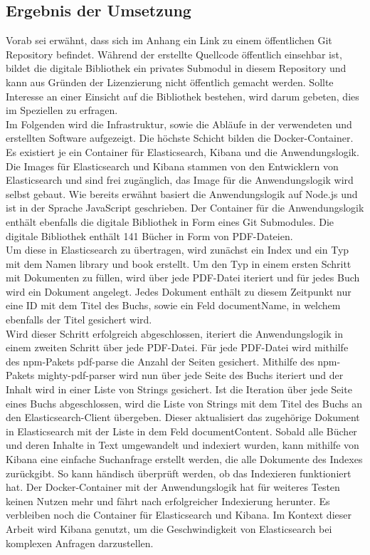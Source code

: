 \documentclass[a4paper]{scrartcl}
\begin{document}
\subsection{Ergebnis der Umsetzung}
Vorab sei erwähnt, dass sich im Anhang ein Link zu einem öffentlichen Git Repository befindet. Während der erstellte Quellcode öffentlich einsehbar ist, bildet die digitale Bibliothek ein privates Submodul in diesem Repository und kann aus Gründen der Lizenzierung nicht öffentlich gemacht werden. Sollte Interesse an einer Einsicht auf die Bibliothek bestehen, wird darum gebeten, dies im Speziellen zu erfragen. \\

Im Folgenden wird die Infrastruktur, sowie die Abläufe in der verwendeten und erstellten Software aufgezeigt. Die höchste Schicht bilden die Docker-Container. Es existiert je ein Container für Elasticsearch, Kibana und die Anwendungslogik. Die Images für Elasticsearch und Kibana stammen von den Entwicklern von Elasticsearch und sind frei zugänglich, das Image für die Anwendungslogik wird selbst gebaut. Wie bereits erwähnt basiert die Anwendungslogik auf Node.js und ist in der Sprache JavaScript geschrieben. Der Container für die Anwendungslogik enthält ebenfalls die digitale Bibliothek in Form eines Git Submodules. Die digitale Bibliothek enthält 141 Bücher in Form von PDF-Dateien. \\

Um diese in Elasticsearch zu übertragen, wird zunächst ein Index und ein Typ mit dem Namen library und book erstellt. Um den Typ in einem ersten Schritt mit Dokumenten zu füllen, wird über jede PDF-Datei iteriert und für jedes Buch wird ein Dokument angelegt. Jedes Dokument enthält zu diesem Zeitpunkt nur eine ID mit dem Titel des Buchs, sowie ein Feld documentName, in welchem ebenfalls der Titel gesichert wird. \\
Wird dieser Schritt erfolgreich abgeschlossen, iteriert die Anwendungslogik in einem zweiten Schritt über jede PDF-Datei. Für jede PDF-Datei wird mithilfe des npm-Pakets pdf-parse die Anzahl der Seiten gesichert. Mithilfe des npm-Pakets mighty-pdf-parser wird nun über jede Seite des Buchs iteriert und der Inhalt wird in einer Liste von Strings gesichert. Ist die Iteration über jede Seite eines Buchs abgeschlossen, wird die Liste von Strings mit dem Titel des Buchs an den Elasticsearch-Client übergeben. Dieser aktualisiert das zugehörige Dokument in Elasticsearch mit der Liste in dem Feld documentContent. Sobald alle Bücher und deren Inhalte in Text umgewandelt und indexiert wurden, kann mithilfe von Kibana eine einfache Suchanfrage erstellt werden, die alle Dokumente des Indexes zurückgibt. So kann händisch überprüft werden, ob das Indexieren funktioniert hat. Der Docker-Container mit der Anwendungslogik hat für weiteres Testen keinen Nutzen mehr und fährt nach erfolgreicher Indexierung herunter. Es verbleiben noch die Container für Elasticsearch und Kibana. Im Kontext dieser Arbeit wird Kibana genutzt, um die Geschwindigkeit von Elasticsearch bei komplexen Anfragen darzustellen.
\end{document}
